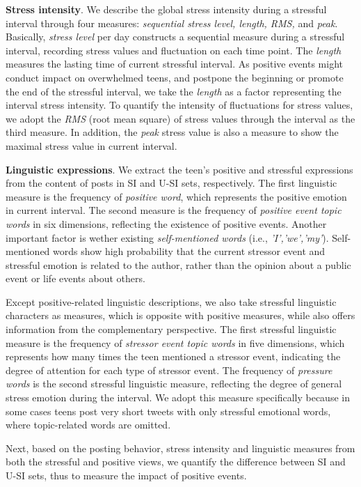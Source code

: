 \textbf{Stress intensity}.
We describe the global stress intensity during a stressful interval through four measures:
\emph{sequential stress level, length, RMS,} and \emph{peak}.
Basically, \emph{stress level} per day constructs a sequential measure during a stressful interval,
recording stress values and fluctuation on each time point.
The \emph{length} measures the lasting time of current stressful interval.
As positive events might conduct impact on overwhelmed teens,
and postpone the beginning or promote the end of the stressful interval,
we take the \emph{length} as a factor representing the interval stress intensity.
To quantify the intensity of fluctuations for stress values,
we adopt the \emph{RMS} (root mean square) of stress values through the interval as the third measure.
In addition, the \emph{peak} stress value is also a measure to show the maximal stress value in current interval.

\textbf{Linguistic expressions}.
We extract the teen's positive and stressful expressions from the content of posts in SI and U-SI sets, respectively.
The first linguistic measure is the frequency of \emph{positive word},
which represents the positive emotion in current interval.
The second measure is the frequency of \emph{positive event topic words} in six dimensions,
reflecting the existence of positive events.
Another important factor is wether existing \emph{self-mentioned words} (i.e., \emph{'I','we','my'}).
Self-mentioned words show high probability that the current stressor event and stressful emotion is related to the author,
rather than the opinion about a public event or life events about others.

Except positive-related linguistic descriptions, we also take stressful linguistic characters as measures,
which is opposite with positive measures, while also offers information from the complementary perspective.
The first stressful linguistic measure is the frequency of \emph{stressor event topic words} in five dimensions,
which represents how many times the teen mentioned a stressor event,
indicating the degree of attention for each type of stressor event.
The frequency of \emph{pressure words} is the second stressful linguistic measure,
reflecting the degree of general stress emotion during the interval.
We adopt this measure specifically because in some cases teens post very short tweets with only stressful emotional words,
where topic-related words are omitted.

Next,
based on the posting behavior, stress intensity and linguistic measures from both the stressful and positive views,
we quantify the difference between SI and U-SI sets, thus to measure the impact of positive events.

